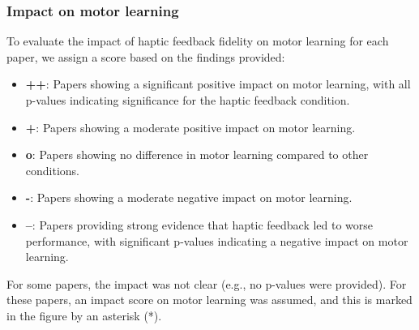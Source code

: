 \subsubsection{Impact on motor learning}

To evaluate the impact of haptic feedback fidelity on motor learning for each paper, we assign a score based on the findings provided:

\begin{itemize}
\item \textbf{++}: Papers showing a significant positive impact on motor learning, with all p-values indicating significance for the haptic feedback condition.
\item \textbf{+}: Papers showing a moderate positive impact on motor learning.
\item \textbf{o}: Papers showing no difference in motor learning compared to other conditions.
\item \textbf{-}: Papers showing a moderate negative impact on motor learning.
\item \textbf{--}: Papers providing strong evidence that haptic feedback led to worse performance, with significant p-values indicating a negative impact on motor learning.
\end{itemize}

For some papers, the impact was not clear (e.g., no p-values were provided). For these papers, an impact score on motor learning was assumed, and this is marked in the figure by an asterisk (*).
